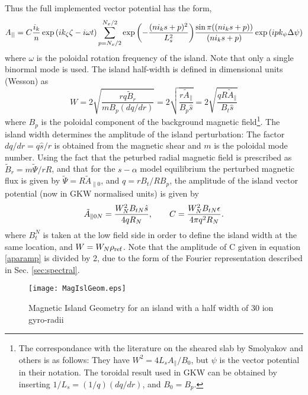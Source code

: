 Thus the full implemented vector potential has the form,
\begin{equation}
A_{||} = C {i_k \over n} \exp{(i k_{\zeta}\zeta - i\omega t)}\sum_{p=N_x/2}^{N_x/2}\exp{\left(-\frac{(n i_k s + p)^2}{L_s^2}\right)}\frac{\sin{\pi((n i_k s + p))}}{(n i_k s + p)}\exp{(i p k_{\psi}\Delta\psi)}
\end{equation}
where $\omega$ is the poloidal rotation frequency of the island.  Note that only a single binormal mode is used.  The island half-width is defined in dimensional units (Wesson) as 
\begin{equation}
W = 2\sqrt{\frac{rq \tilde B_{r}}{m B_p (dq/dr)}} = 2\sqrt{\frac{r \tilde A_\parallel}{B_p {\hat s}}} = 2\sqrt{\frac{q R \tilde A_\parallel}{B_t {\hat s}}}
\end{equation}
where $B_p$ is the poloidal component of the background magnetic field\footnote{The correspondance with the literature on the sheared slab by Smolyakov and others is as follows: They have $W^2 = 4 L_s A_{\parallel} / B_0$, but $\psi$ is the vector potential in their notation.  The toroidal result used in GKW can be obtained by inserting $1/L_s = (1/q)(dq/dr)$, and $B_0 = B_p$.}.  The island width determines the amplitude of the island perturbation:  The factor $dq/dr = q {\hat s} / r$ is obtained from the magnetic shear and $m$ is the poloidal mode number.  Using the fact that the peturbed radial magnetic field is prescribed as $\tilde{B}_{r}= m\tilde{\Psi} /rR$, and that for the $s-\alpha$ model equilibrium the perturbed magnetic flux is given by $\tilde{\Psi} = R\tilde{A}_{\parallel 0}$, and $q=r B_t / R B_p$, the amplitude of the island vector potential (now in GKW normalised units) is given by
\begin{equation}
\tilde{A}_{\parallel0N} = {W_N^2 B_{tN} {\hat s} \over 4 q R_N}, \qquad  C = {W_N^2 B_{tN} \epsilon \over 4 \pi q^2 R_N}.
\label{aparamp}
\end{equation} 
where $B_t^N$ is taken at the low field side in order to define the island width at the same location, and $W = W_N \rho_{\rm ref}$. Note that the amplitude of C given in equation \ref{aparamp} is divided by 2, due to the form of the Fourier representation described in Sec. \ref{sec:spectral}.  %


\begin{figure}
\begin{center}
\texttt{[image: MagIslGeom.eps]}
\caption{Magnetic Island Geometry for an island with a half width of 30 ion gyro-radii}
\label{islandgeom}
\end{center}
\end{figure}

